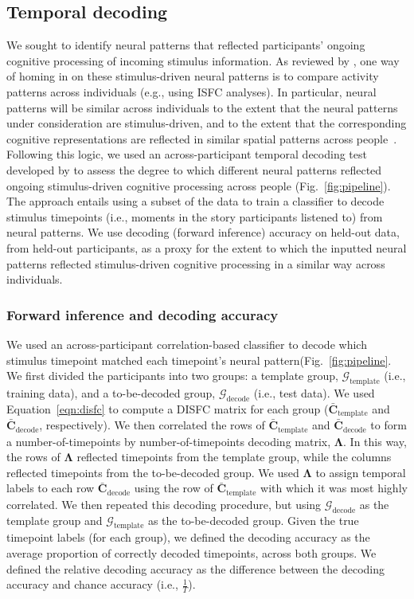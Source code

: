 \documentclass[english]{article}
\begin{document}
\subsection*{Temporal decoding}
We sought to identify neural patterns that reflected participants'
ongoing cognitive processing of incoming stimulus information.  As
reviewed by \cite{SimoEtal16}, one way of homing in on these
stimulus-driven neural patterns is to compare activity patterns across
individuals (e.g., using ISFC analyses).  In particular, neural
patterns will be similar across individuals to the extent that the
neural patterns under consideration are stimulus-driven, and to the
extent that the corresponding cognitive representations are reflected
in similar spatial patterns across people~\citep[also see][]{SimoChan20}.  Following this logic, we
used an across-participant temporal decoding test developed by
\cite{MannEtal18} to assess the degree to which different neural
patterns reflected ongoing stimulus-driven cognitive processing across
people (Fig.~\ref{fig:pipeline}).  The approach entails using a subset of the data to train a
classifier to decode stimulus timepoints (i.e., moments in the story
participants listened to) from neural patterns.  We use decoding
(forward inference) accuracy on held-out data, from held-out
participants, as a proxy for the extent to which the inputted neural
patterns reflected stimulus-driven cognitive processing in a similar
way across individuals.

\subsubsection*{Forward inference and decoding accuracy}
We used an across-participant correlation-based classifier to decode
which stimulus timepoint matched each timepoint's neural pattern(Fig.~\ref{fig:pipeline}.  We
first divided the participants into two groups: a template group,
$\mathcal{G}_{\mathrm{template}}$ (i.e., training data), and a to-be-decoded group,
$\mathcal{G}_{\mathrm{decode}}$ (i.e., test data).  We used Equation~\ref{eqn:disfc} to
compute a DISFC matrix for each group
($\bar{\textbf{C}}_{\mathrm{template}}$ and
$\bar{\textbf{C}}_{\mathrm{decode}}$, respectively).  We then
correlated the rows of $\bar{\textbf{C}}_{\mathrm{template}}$ and
$\bar{\textbf{C}}_{\mathrm{decode}}$ to form a number-of-timepoints by
number-of-timepoints decoding matrix, $\mathbf{\Lambda}$.  In this
way, the rows of $\mathbf{\Lambda}$ reflected timepoints from the
template group, while the columns reflected timepoints from the
to-be-decoded group.  We used $\mathbf{\Lambda}$ to assign temporal
labels to each row $\bar{\textbf{C}}_{\mathrm{decode}}$ using the row
of $\bar{\textbf{C}}_{\mathrm{template}}$ with which it was most
highly correlated.  We then repeated this decoding procedure, but
using $\mathcal{G}_{\mathrm{decode}}$ as the template group and
$\mathcal{G}_{\mathrm{template}}$ as the to-be-decoded group.  Given
the true timepoint labels (for each group), we defined the
decoding accuracy as the average proportion of correctly
decoded timepoints, across both groups.  We defined the
relative decoding accuracy as the difference between the
decoding accuracy and chance accuracy (i.e., $\frac{1}{T}$).
\end{document}
